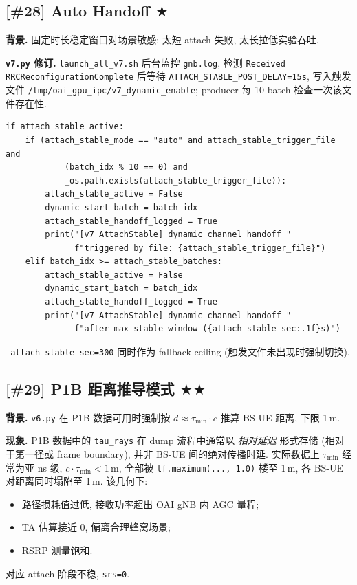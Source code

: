 \documentclass[11pt,a4paper,UTF8,fontset=fandol]{ctexart}
\newcommand{\sone}{\textcolor{starcolor}{$\bigstar$}}
\newcommand{\stwo}{\textcolor{starcolor}{$\bigstar\bigstar$}}
\newcommand{\vsix}{\texttt{v6.py}}
\newcommand{\vseven}{\texttt{v7.py}}
\newcommand{\bugitem}[3]{%
  \subsection{[\##1] #2 \hfill #3}%
  \vspace{-0.5em}%
}
\begin{document}
\bugitem{28}{Auto Handoff}{\sone}

\textbf{背景.} 固定时长稳定窗口对场景敏感: 太短 attach 失败,
太长拉低实验吞吐.

\textbf{\vseven{} 修订.} \texttt{launch\_all\_v7.sh} 后台监控
\texttt{gnb.log}, 检测 \texttt{Received RRCReconfigurationComplete}
后等待 \texttt{ATTACH\_STABLE\_POST\_DELAY=15s},
写入触发文件 \texttt{/tmp/oai\_gpu\_ipc/v7\_dynamic\_enable};
producer 每 10 batch 检查一次该文件存在性.
\begin{lstlisting}[caption={v7.py: lines 2170--2184}]
if attach_stable_active:
    if (attach_stable_mode == "auto" and attach_stable_trigger_file and
            (batch_idx % 10 == 0) and
            _os.path.exists(attach_stable_trigger_file)):
        attach_stable_active = False
        dynamic_start_batch = batch_idx
        attach_stable_handoff_logged = True
        print("[v7 AttachStable] dynamic channel handoff "
              f"triggered by file: {attach_stable_trigger_file}")
    elif batch_idx >= attach_stable_batches:
        attach_stable_active = False
        dynamic_start_batch = batch_idx
        attach_stable_handoff_logged = True
        print("[v7 AttachStable] dynamic channel handoff "
              f"after max stable window ({attach_stable_sec:.1f}s)")
\end{lstlisting}
\texttt{--attach-stable-sec=300} 同时作为 fallback ceiling
(触发文件未出现时强制切换).

\bugitem{29}{P1B 距离推导模式}{\stwo}

\textbf{背景.} \vsix{} 在 P1B 数据可用时强制按 $d \approx \tau_{\min} \cdot c$
推算 BS-UE 距离, 下限 1\,m.

\textbf{现象.} P1B 数据中的 \texttt{tau\_rays} 在 dump 流程中通常以
\textit{相对延迟} 形式存储 (相对于第一径或 frame boundary), 并非
BS-UE 间的绝对传播时延. 实际数据上 $\tau_{\min}$ 经常为亚 ns 级,
$c \cdot \tau_{\min} < 1\,\text{m}$, 全部被 \texttt{tf.maximum(..., 1.0)}
楼至 1\,m, 各 BS-UE 对距离同时塌陷至 1\,m. 该几何下:
\begin{itemize}
  \item 路径损耗值过低, 接收功率超出 OAI gNB 内 AGC 量程;
  \item TA 估算接近 0, 偏离合理蜂窝场景;
  \item RSRP 测量饱和.
\end{itemize}
对应 attach 阶段不稳, \texttt{srs=0}.
\end{document}
